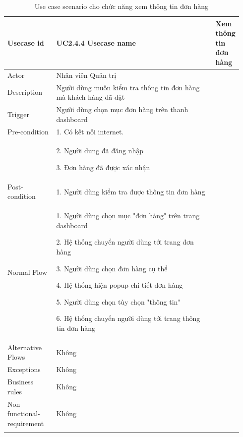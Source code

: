 \begin{longtable}{|>{\hspace{0pt}}m{0.213\linewidth}|>{\hspace{0pt}}m{0.729\linewidth}|} 
\hline
Usecase id & UC2.4.4 \endfirsthead 
\hline
Usecase name & Xem thông tin đơn hàng \\ 
\hline
Actor & Nhân viên Quản trị \\ 
\hline
Description & Người dùng muốn kiểm tra thông tin đơn hàng mà khách hàng đã đặt  \\ 
\hline
Trigger & Người dùng chọn mục đơn hàng trên thanh dashboard  \\ 
\hline
Pre-condition & 1. Có kết nối internet. \\
& 2. Người dung đã đăng nhập \par{} 3. Đơn hàng đã được xác nhận\\ 
\hline
Post-condition & 1. Người dùng kiểm tra được thông tin đơn hàng \\ 
\hline
Normal Flow & 1. Người dùng chọn mục "đơn hàng" trên trang dashboard \par{}2. Hệ thống chuyển người dùng tới trang đơn hàng \par{}3. Người dùng chọn đơn hàng cụ thể \par{}4. Hệ thống hiện popup chi tiết đơn hàng \par{}5. Người dùng chọn tùy chọn "thông tin" \par{}6. Hệ thống chuyển người dùng tới trang thông tin đơn hàng \\  
\hline
Alternative Flows & Không \\
\hline
Exceptions & Không \\ 
\hline
Business rules & Không \\ 
\hline
Non functional-requirement & Không \\ 
\hline
\caption{Use case scenario cho chức năng xem thông tin đơn hàng}
\end{longtable}

